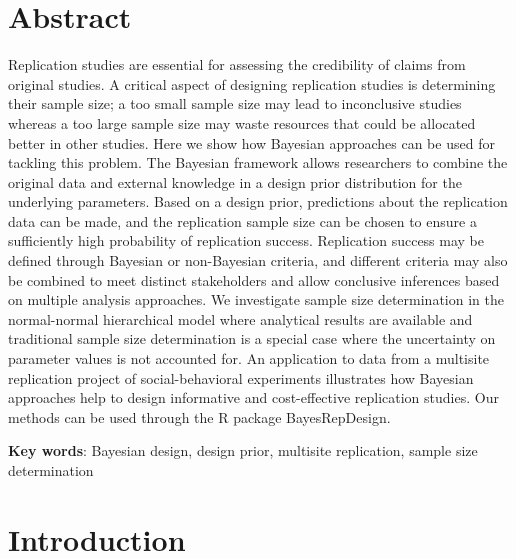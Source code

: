 
\section*{Abstract}

Replication studies are essential for assessing the credibility of claims from
original studies. A critical aspect of designing replication studies is
determining their sample size; a too small sample size may lead to inconclusive
studies whereas a too large sample size may waste resources that could be
allocated better in other studies. Here we show how Bayesian approaches can be
used for tackling this problem. The Bayesian framework allows researchers to
combine the original data and external knowledge in a design prior distribution
for the underlying parameters. Based on a design prior, predictions about the
replication data can be made, and the replication sample size can be chosen to
ensure a sufficiently high probability of replication success. Replication
success may be defined through Bayesian or non-Bayesian criteria, and different
criteria may also be combined to meet distinct stakeholders and allow conclusive
inferences based on multiple analysis approaches. We investigate sample size
determination in the normal-normal hierarchical model where analytical results
are available and traditional sample size determination is a special case where
the uncertainty on parameter values is not accounted for. An application to data
from a multisite replication project of social-behavioral experiments
illustrates how Bayesian approaches help to design informative and
cost-effective replication studies. Our methods can be used through the R
package BayesRepDesign.

\textbf{Key words}: Bayesian design, design prior, multisite replication, sample
size determination



\section{Introduction}

